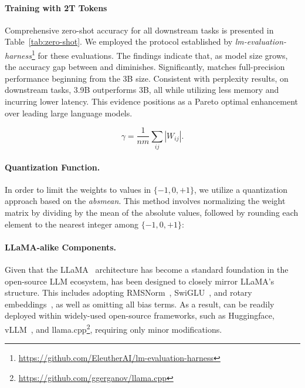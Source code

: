 \paragraph{Training with 2T Tokens}

Comprehensive zero-shot accuracy for all downstream tasks is presented in Table~\ref{tab:zero-shot}. We employed the protocol established by \emph{lm-evaluation-harness}\footnote{\url{https://github.com/EleutherAI/lm-evaluation-harness}} for these evaluations. The findings indicate that, as model size grows, the accuracy gap between  and  diminishes. Significantly,  matches full-precision performance beginning from the 3B size. Consistent with perplexity results, on downstream tasks,  3.9B outperforms  3B, all while utilizing less memory and incurring lower latency. This evidence positions  as a Pareto optimal enhancement over leading large language models.

\begin{equation}
    \gamma = \frac{1}{nm}\sum_{ij} |W_{ij}|.
\end{equation}

\paragraph{Quantization Function.} In order to limit the weights to values in $\{-1, 0, +1\}$, we utilize a quantization approach based on the \emph{absmean}. This method involves normalizing the weight matrix by dividing by the mean of the absolute values, followed by rounding each element to the nearest integer among $\{-1, 0, +1\}$:

\paragraph{LLaMA-alike Components.}

Given that the LLaMA~\cite{llama, llama2} architecture has become a standard foundation in the open-source LLM ecosystem,  has been designed to closely mirror LLaMA's structure. This includes adopting RMSNorm~\cite{rmsnorm}, SwiGLU~\cite{swiglu}, and rotary embeddings~\cite{rope}, as well as omitting all bias terms. As a result,  can be readily deployed within widely-used open-source frameworks, such as Huggingface, vLLM~\cite{vllm}, and llama.cpp\footnote{\url{https://github.com/ggerganov/llama.cpp}}, requiring only minor modifications.

